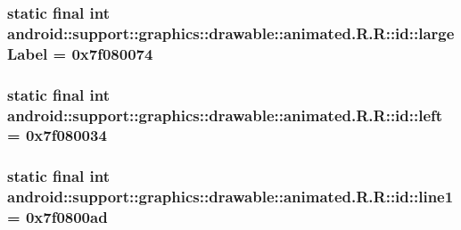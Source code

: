 \hypertarget{classandroid_1_1support_1_1graphics_1_1drawable_1_1animated_1_1_r_1_1id_fc95d05ec83ac4779c3cfc73938f4cf4}{
\subsubsection[{largeLabel}]{\setlength{\rightskip}{0pt plus 5cm}static final int android::support::graphics::drawable::animated.R.R::id::largeLabel = 0x7f080074}}
\label{classandroid_1_1support_1_1graphics_1_1drawable_1_1animated_1_1_r_1_1id_fc95d05ec83ac4779c3cfc73938f4cf4}


\hypertarget{classandroid_1_1support_1_1graphics_1_1drawable_1_1animated_1_1_r_1_1id_56df7f456a3656c228da338c49ab9fad}{
\subsubsection[{left}]{\setlength{\rightskip}{0pt plus 5cm}static final int android::support::graphics::drawable::animated.R.R::id::left = 0x7f080034}}
\label{classandroid_1_1support_1_1graphics_1_1drawable_1_1animated_1_1_r_1_1id_56df7f456a3656c228da338c49ab9fad}


\hypertarget{classandroid_1_1support_1_1graphics_1_1drawable_1_1animated_1_1_r_1_1id_52674ffa9cd6d8b6f45b4c6fa65c80b4}{
\subsubsection[{line1}]{\setlength{\rightskip}{0pt plus 5cm}static final int android::support::graphics::drawable::animated.R.R::id::line1 = 0x7f0800ad}}
\label{classandroid_1_1support_1_1graphics_1_1drawable_1_1animated_1_1_r_1_1id_52674ffa9cd6d8b6f45b4c6fa65c80b4}


